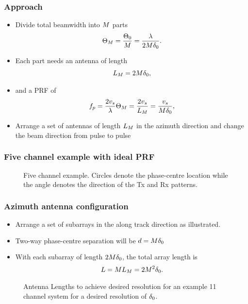 \documentclass{beamer}
\begin{document}
\begin{frame}
\frametitle{Approach}
\begin{itemize}
\item Divide total beamwidth into $M$ parts
\begin{equation}
 \Theta_{M} = \frac{\Theta_{0}}{M}=\frac{\lambda}{2M\delta_0}.
\end{equation}
\item Each part needs an antenna of length
\begin{equation}
 L_M = 2M\delta_0,
\end{equation}
\item and a PRF of
\begin{equation}
 f_p = \frac{2v_s}{\lambda}\Theta_{M} = \frac{2v_s}{L_M} = \frac{v_s}{M\delta_0},
 \label{eq:requiredPRF}
\end{equation}
\item Arrange a set of antennas of length $L_M$ in the azimuth direction and change the beam direction from pulse to pulse
\end{itemize}
\end{frame}
%
\begin{frame}
\frametitle{Five channel example with ideal PRF}
\begin{figure}[h!]
\begin{center}
 \resizebox{!}{0.7\textheight}{}
 \caption{Five channel example. Circles denote the phase-centre location while the angle denotes the direction of the Tx and Rx patterns.}
 \label{fg:fivechan}
 \end{center}
\end{figure}
\end{frame}
%
\begin{frame}
\frametitle{Azimuth antenna configuration}
\begin{itemize}
\item Arrange a set of subarrays in the along track direction as illustrated. 
\item Two-way phase-centre separation will be $d=M\delta_0$
\item With each subarray of length $2M\delta_0$, the total array length is
\begin{equation}
 L = ML_M = 2M^2\delta_0.
\end{equation}
\end{itemize}
\begin{figure}[h!]
\begin{center}
 \resizebox{0.4\columnwidth}{!}{}
 \caption{Antenna Lengths to achieve desired resolution for an example 11 channel system for a desired resolution of $\delta_0$.}
 \label{fg:antennaLenghts}
 \end{center}
\end{figure}
\end{frame}
\end{document}
